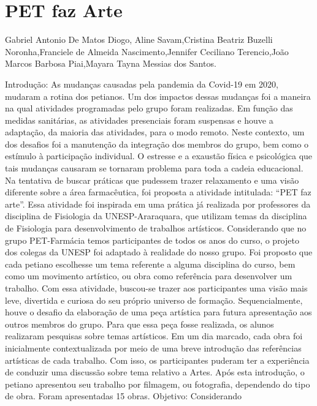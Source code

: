 

\section{PET faz Arte}

Gabriel Antonio De Matos Diogo, Aline Savam,Cristina Beatriz Buzelli Noronha,Franciele de Almeida Nascimento,Jennifer Ceciliano Terencio,João Marcos Barbosa Piai,Mayara Tayna Messias dos Santos.

Introdução: As mudanças causadas pela pandemia da Covid-19 em 2020, mudaram a rotina dos
petianos. Um dos impactos dessas mudanças foi a maneira na qual atividades programadas pelo 
grupo foram realizadas. Em função das medidas sanitárias, as atividades presenciais foram 
suspensas e houve a adaptação, da maioria das atividades, para o modo remoto. Neste contexto, 
um dos desafios foi a manutenção da integração dos membros do grupo, bem como o estímulo à 
participação individual. O estresse e a exaustão física e psicológica que tais mudanças causaram 
se tornaram problema para toda a cadeia educacional. Na tentativa de buscar práticas que pudessem 
trazer relaxamento e uma visão diferente sobre a área farmacêutica, foi proposta a atividade 
intitulada: “PET faz arte”. Essa atividade foi inspirada em uma prática já realizada por professores 
da disciplina de Fisiologia da UNESP-Araraquara, que utilizam temas da disciplina de Fisiologia 
para desenvolvimento de trabalhos artísticos. Considerando que no grupo PET-Farmácia temos 
participantes de todos os anos do curso, o projeto dos colegas da UNESP foi adaptado à realidade 
do nosso grupo. Foi proposto que cada petiano escolhesse um tema referente a alguma disciplina 
do curso, bem como um movimento artístico, ou obra como referência para desenvolver um 
trabalho. Com essa atividade, buscou-se trazer aos participantes uma visão mais leve, divertida e 
curiosa do seu próprio universo de formação. Sequencialmente, houve o desafio da elaboração de 
uma peça artística para futura apresentação aos outros membros do grupo. Para que essa peça fosse 
realizada, os alunos realizaram pesquisas sobre temas artísticos. Em um dia marcado, cada obra 
foi inicialmente contextualizada por meio de uma breve introdução das referências artísticas de 
cada trabalho. Com isso, os participantes puderam ter a experiência de conduzir uma discussão 
sobre tema relativo a Artes. Após esta introdução, o petiano apresentou seu trabalho por filmagem, 
ou fotografia, dependendo do tipo de obra. Foram apresentadas 15 obras. Objetivo: Considerando 
